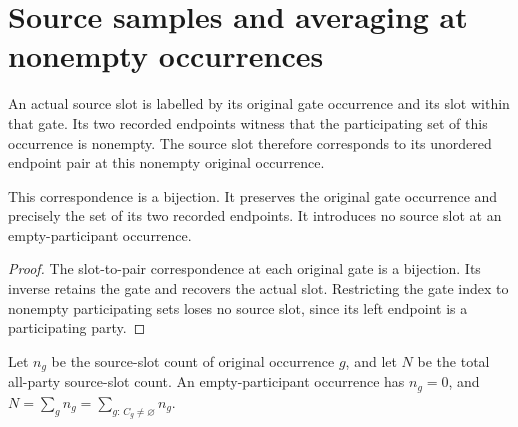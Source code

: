 \section{Source samples and averaging at nonempty occurrences}
\label{sec:peps_nonempty_source_samples}

\begin{definition}
    \label{def:peps_nonempty_source_samples}
    \leanok
    An actual source slot is labelled by its original gate occurrence
    and its slot within that gate. Its two recorded endpoints witness
    that the participating set of this occurrence is nonempty. The
    source slot therefore corresponds to its unordered endpoint pair
    at this nonempty original occurrence.
\end{definition}

\begin{theorem}
    \label{thm:peps_nonempty_source_sample_endpoints}
    \leanok
    This correspondence is a bijection. It preserves the original
    gate occurrence and precisely the set of its two recorded endpoints.
    It introduces no source slot at an empty-participant occurrence.
\end{theorem}

\begin{proof}\leanok
    The slot-to-pair correspondence at each original gate is a bijection.
    Its inverse retains the gate and recovers the actual slot. Restricting
    the gate index to nonempty participating sets loses no source slot,
    since its left endpoint is a participating party.
\end{proof}

\begin{theorem}
    \label{thm:peps_nonempty_source_slot_count}
    \leanok
    Let $n_g$ be the source-slot count of original occurrence $g$,
    and let $N$ be the total all-party source-slot count. An
    empty-participant occurrence has $n_g=0$, and
    $N=\sum_g n_g=\sum_{g:\,C_g\ne\varnothing}n_g$.
\end{theorem}

